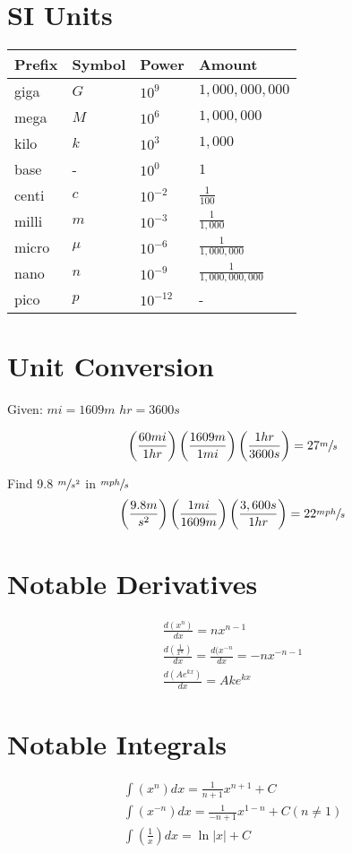 \documentclass[titlepage]{article}
\begin{document}
\section{SI Units}

\begin{tabular}{ l | l | l | l }
    Prefix & Symbol & Power & Amount \\
    \hline
    giga & $G$ & $10^{9}$ & $1,000,000,000$ \\
    mega & $M$ & $10^{6}$ & $1,000,000$ \\
    kilo & $k$ & $10^{3}$ & $1,000$ \\
    base & - & $10^{0}$ & $1$ \\
    centi & $c$ & $10^{-2}$ & $\frac{1}{100}$ \\
    milli & $m$ & $10^{-3}$ & $\frac{1}{1,000}$ \\
    micro & $\mu$ & $10^{-6}$ & $\frac{1}{1,000,000}$ \\
    nano & $n$ & $10^{-9}$ & $\frac{1}{1,000,000,000}$ \\
    pico & $p$ & $10^{-12}$ & - \\
\end{tabular}

\section{Unit Conversion}

Given:
$mi = 1609 m$
$hr = 3600 s$

$$\left(\frac{60 mi}{1 hr}\right)\left(\frac{1609 m}{1 mi}\right)\left(\frac{1 hr}{3600 s}\right) = 27 \sfrac{m}{s}$$

\noindent
Find 9.8 $\sfrac{m}{s^{2}}$ in $\sfrac{mph}{s}$
$$\left(\frac{9.8 m}{s^{2}}\right)\left(\frac{1 mi}{1609 m}\right)\left(\frac{3,600 s}{1 hr}\right) = 22 \sfrac{mph}{s}$$

\section{Notable Derivatives}

\begin{gather}
    \frac{d(x^{n})}{dx} = nx^{n-1} \\
    \frac{d(\frac{1}{x^{n}})}{dx} = \frac{d(x^{-n}}{dx}=-nx^{-n-1} \\
    \frac{d(Ae^{kx})}{dx}=Ake^{kx}
\end{gather}

\section{Notable Integrals}

\begin{gather}
    \int(x^{n})dx = \frac{1}{n+1} x^{n+1} + C \\
    \int(x^{-n})dx = \frac{1}{-n+1}x^{1-n} + C (n \neq 1) \\
    \int \left(\frac{1}{x} \right)dx = \ln|x| + C
\end{gather}
\end{document}
